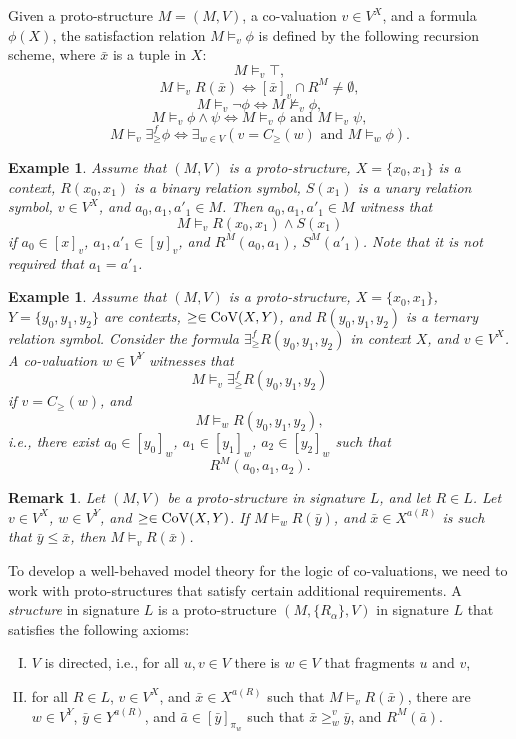 \documentclass[12pt]{amsart}
\theoremstyle{plain}
\newtheorem{remark}[theorem]{\bf Remark}
\newtheorem{example}[theorem]{\bf Example}
\newcommand \Val{{\rm{CoV}}}
\newcommand \fr{\scriptscriptstyle{f}}
\begin{document}
Given a proto-structure $M = (M, V)$, a co-valuation $v \in V^X$, and a formula $\phi(X)$, the satisfaction relation $M \vDash_v \phi$ is defined by the following recursion scheme, where $\bar{x}$ is a tuple in $X$:
	\[ M \vDash_v \top, \]
	\[	M \vDash_v R(\bar{x}) \iff [\bar{x}]_v \cap R^M \neq \emptyset, \]
	\[M \vDash_v \neg \phi \iff M \nvDash_v \phi, \]
	\[	M \vDash_v \phi \land \psi \iff M \vDash_v \phi \mbox{ and }  M \vDash_v \psi, \]
	\[ M \vDash_v \exists^{\fr}_{\geq} \phi \iff
	\exists_{w \in V} (v=C_\geq(w) \mbox{ and } M \vDash_w \phi). \]

\begin{example}
Assume that $(M,V)$ is a proto-structure, $X=\{x_0,x_1\}$ is a context, $R(x_0,x_1)$ is a binary relation symbol, $S(x_1)$ is a unary relation symbol, $v \in V^X$, and $a_0,a_1,a'_1 \in M$.  Then $a_0,a_1,a'_1 \in M$ witness that $$M \vDash_v R(x_0,x_1) \land S(x_1)$$ if $a_0\in [x]_v$, $a_1,a'_1 \in [y]_v$, and $R^M(a_0,a_1)$, $S^M(a'_1)$. Note that it is not required that  $a_1=a'_1$.  
\end{example}

\begin{example}
Assume that $(M,V)$ is a proto-structure, $X=\{x_0,x_1\}$, $Y=\{y_0,y_1,y_2\}$ are contexts, $\geq \in \Val(X,Y)$, and $R(y_0,y_1,y_2)$ is a ternary relation symbol. Consider the formula $\exists^f_\geq R(y_0,y_1,y_2)$ in context $X$, and $v \in V^X$. A co-valuation $w \in V^Y$ witnesses that $$M \vDash_v \exists^f_\geq R(y_0,y_1,y_2)$$ if $v=C_\geq(w)$, and $$M \vDash_w R(y_0,y_1,y_2),$$ i.e., there exist $a_0 \in [y_0]_w$, $a_1 \in [y_1]_w$, $a_2 \in [y_2]_w$ such that  $$R^M(a_0,a_1,a_2).$$  
\end{example}
	

\begin{remark}
		Let $(M,V)$ be a proto-structure in signature $L$, and let $R \in L$. Let $v \in V^X$, $w \in V^Y$, and $\geq \in \Val(X,Y)$. If $M \vDash_w R(\bar{y})$, and $\bar{x} \in X^{a(R)}$ is such that $\bar{y} \leq \bar{x}$, then $M \vDash_v R(\bar{x})$.  
\end{remark}
\medskip
	
To develop a well-behaved model theory for the logic of co-valuations, we need to work with proto-structures that satisfy certain additional requirements. A \emph{structure} in signature $L$ is a proto-structure $(M,\{R_\alpha\},V)$ in signature $L$ that satisfies the following axioms:
	
	\begin{enumerate}[(I)]
		\item $V$ is directed, i.e., for all $u,v \in V$ there is $w \in V$ that fragments $u$ and $v$,
		\item for all $R \in L$, $v \in V^X$, and $\bar{x} \in X^{a(R)}$ such that $M \vDash_v R(\bar{x})$, there are $w \in V^Y$, $\bar{y} \in Y^{a(R)}$, and $\bar{a} \in [\bar{y}]_{\pi_{w}}$ such that $\bar{x} \geq^v_w \bar{y}$, and $R^M(\bar{a})$.
	\end{enumerate} 
	
\end{document}
